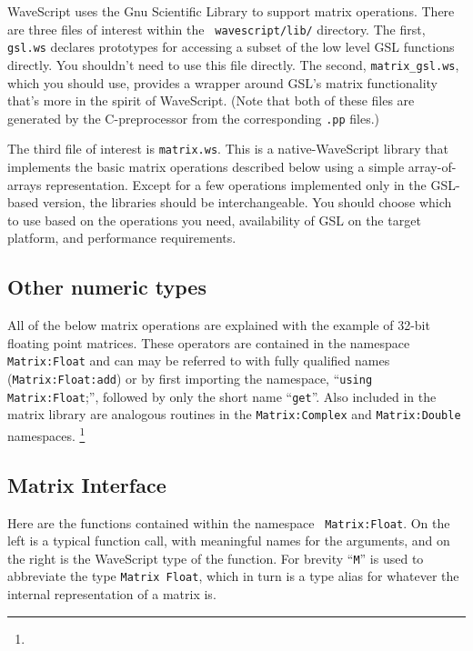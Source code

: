 WaveScript uses the Gnu Scientific Library to support matrix
operations.  There are three files of interest within the {\tt
wavescript/lib/} directory.  The first, {\tt gsl.ws} declares
prototypes for accessing a subset of the low level GSL functions
directly.  You shouldn't need to use this file directly.  The second,
{\tt matrix\_gsl.ws}, which you should use, provides a wrapper around
GSL's matrix functionality that's more in the spirit of WaveScript.
(Note that both of these files are generated by the C-preprocessor from
the corresponding {\tt .pp} files.)

The third file of interest is {\tt matrix.ws}.  This is a
native-WaveScript library that implements the basic matrix operations
described below using a simple array-of-arrays representation.  Except
for a few operations implemented only in the GSL-based version,
the libraries should be interchangeable.  You should choose which to
use based on the operations you need, availability of GSL on the
target platform, and performance requirements.

\subsection{Other numeric types}

All of the below matrix operations are explained with the example of
32-bit floating point matrices.  These operators are contained in the
namespace {\tt Matrix:Float} and can may be referred to with fully
qualified names ({\tt Matrix:Float:add}) or by first importing the
namespace, ``{\tt using Matrix:Float};'', followed by only the short
name ``{\tt get}''.  Also included in the matrix library are analogous
routines in the {\tt Matrix:Complex} and {\tt Matrix:Double} namespaces.
\footnote{}

\subsection{Matrix Interface}

Here are the functions contained within the namespace {\tt
  Matrix:Float}.  On the left is a typical function call, with
  meaningful names for the arguments, and on the right is the
  WaveScript type of the function.  For brevity ``{\tt M}'' is used to
  abbreviate the type {\tt Matrix Float}, which in turn is a type
  alias for whatever the internal representation of a matrix is.

